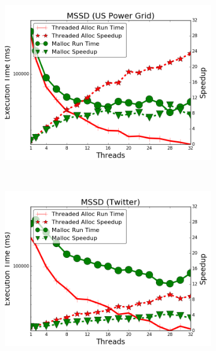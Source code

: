 \begin{figure}[h]
\begin{subfigure}[b]{\smallplotsize\textwidth}
                \includegraphics[width=\textwidth]{experiments/scalability/malloc-allocator-shortest-uspowergrid.png}
                \label{fig:implementation:malloc_sssp}
        \end{subfigure}
        ~
        \begin{subfigure}[b]{\smallplotsize\textwidth}
                \includegraphics[width=\textwidth]{experiments/scalability/malloc-allocator-shortest-twitter.png}
                \label{fig:implementation:malloc_sssp2}
        \end{subfigure}\\
        \begin{subfigure}[b]{\smallplotsize\textwidth}

\end{subfigure}
\end{figure}
